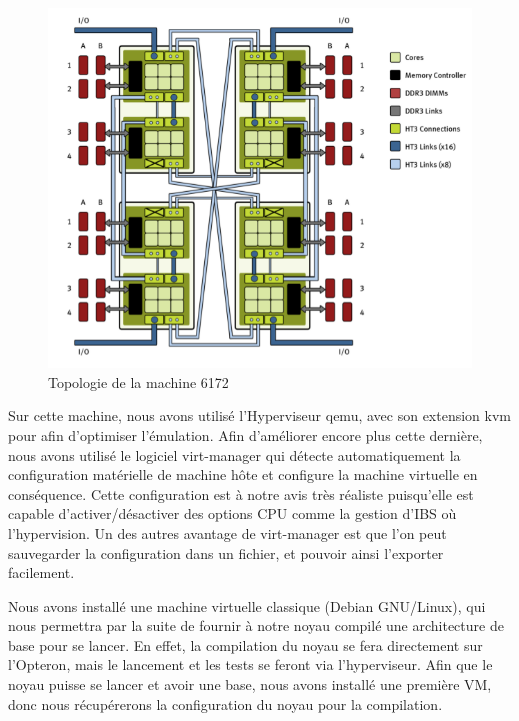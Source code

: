         \begin{figure}[!ht]
          \centering
          \includegraphics[scale=0.55]{img/numa_arch_details.png}
          \caption{Topologie de la machine 6172}
          \label{f:numa_topology}
        \end{figure}

        Sur cette machine, nous avons utilisé l'Hyperviseur qemu, avec son extension
        kvm pour afin d'optimiser l'émulation. Afin d'améliorer encore plus cette
        dernière, nous avons utilisé le logiciel virt-manager qui détecte
        automatiquement la configuration matérielle de machine hôte et configure la
        machine virtuelle en conséquence. Cette configuration est à notre avis très
        réaliste puisqu'elle est capable d'activer/désactiver des options CPU comme
        la gestion d'IBS où l'hypervision. Un des autres avantage de virt-manager
        est que l'on peut sauvegarder la configuration dans un fichier, et pouvoir
        ainsi l'exporter facilement.

        Nous avons installé une machine virtuelle classique (Debian GNU/Linux), qui
        nous permettra par la suite de fournir à notre noyau compilé une
        architecture de base pour se lancer. En effet, la compilation du noyau se
        fera directement sur l'Opteron, mais le lancement et les tests se feront via
        l'hyperviseur. Afin que le noyau puisse se lancer et avoir une base, nous
        avons installé une première VM, donc nous récupérerons la configuration du
        noyau pour la compilation.

